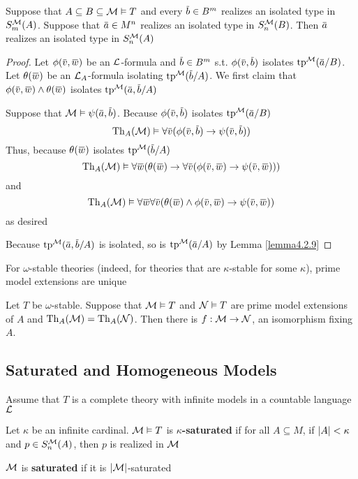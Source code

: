 \documentclass[11pt]{article}
\begin{document}
\begin{lemma}[]
Suppose that \(A\subseteq B\subseteq \mathcal{M}\vDash T\) and every \(\barb\in B^m\) realizes an isolated type in \(S_m^{\mathcal{M}}(A)\).
Suppose that \(\bara\in M^n\) realizes an isolated type in \(S_n^{\mathcal{M}}(B)\). Then \(\bara\) realizes
an isolated type in \(S_n^{\mathcal{M}}(A)\)
\end{lemma}

\begin{proof}
Let \(\phi(\barv,\barw)\) be an \(\mathcal{L}\)-formula and \(\barb\in B^m\) s.t. \(\phi(\barv,\barb)\)
isolates \(\tp^{\calm}(\bara/B)\). Let \(\theta(\barw)\) be an \(\mathcal{L}_A\)-formula
isolating \(\tp^{\calm}(\barb/A)\). We first claim that \(\phi(\barv,\barw)\wedge\theta(\barw)\)
isolates \(\tp^{\calm}(\bara,\barb/A)\)

Suppose that \(\calm\vDash\psi(\bara,\barb)\). Because \(\phi(\barv,\barb)\) isolates \(\tp^{\calm}(\bara/B)\)
\begin{equation*}
\Th_A(\calm)\vDash\forall\barv(\phi(\barv,\barb)\to\psi(\barv,\barb))
\end{equation*}
Thus, because \(\theta(\barw)\) isolates \(\tp^{\calm}(\barb/A)\)
\begin{equation*}
\Th_A(\calm)\vDash\forall\barw(\theta(\barw)\to\forall\barv(\phi(\barv,\barw)\to\psi(\barv,\barw)))
\end{equation*}
and
\begin{equation*}
\Th_A(\calm)\vDash\forall\barw\forall\barv(\theta(\barw)\wedge\phi(\barv,\barw)\to\psi(\barv,\barw))
\end{equation*}
as desired

Because \(\tp^{\calm}(\bara,\barb/A)\) is isolated, so is \(\tp^{\calm}(\bara/A)\) by Lemma
\ref{lemma4.2.9}
\end{proof}

For \(\omega\)-stable theories (indeed, for theories that are \(\kappa\)-stable for some \(\kappa\)), prime model
extensions are unique

\begin{theorem}[]
Let \(T\) be \(\omega\)-stable. Suppose that \(\mathcal{M}\vDash T\) and \(\mathcal{N}\vDash T\) are prime model extensions of \(A\)
and \(\operatorname{Th}_A(\mathcal{M})=\operatorname{Th}_A(\mathcal{N})\). Then there is \(f:\mathcal{M}\to\mathcal{N}\), an isomorphism fixing \(A\).
\end{theorem}
\subsection{Saturated and Homogeneous Models}
\label{sec:org209ddd8}
Assume that \(T\) is a complete theory with infinite models in a countable language \(\mathcal{L}\)
\begin{definition}[]
Let \(\kappa\) be an infinite cardinal. \(\mathcal{M}\vDash T\) is \textbf{\(\kappa\)-saturated} if for all \(A\subseteq M\),
if \(\abs{A}<\kappa\) and \(p\in S_n^{\mathcal{M}}(A)\), then \(p\) is realized in \(\mathcal{M}\)

\(\mathcal{M}\) is \textbf{saturated} if it is \(\abs{\calm}\)-saturated
\end{definition}
\end{document}
